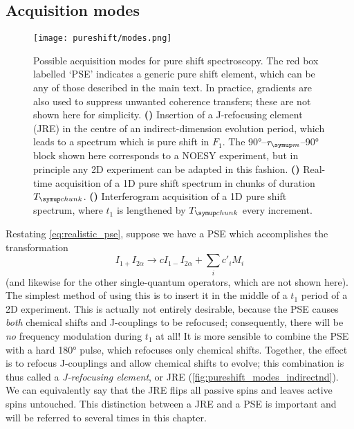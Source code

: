 \subsection{Acquisition modes}
\label{subsec:pureshift__acquisition_modes}

\begin{figure}[htbp]
    \centering
    \texttt{[image: pureshift/modes.png]}%
    {\label{fig:pureshift_modes_indirectnd}}%
    {\label{fig:pureshift_modes_realtime}}%
    {\label{fig:pureshift_modes_interferogram}}%
    \caption[Pure shift acquisition modes]{
        Possible acquisition modes for pure shift spectroscopy.
        The red box labelled `PSE' indicates a generic pure shift element, which can be any of those described in the main text.
        In practice, gradients are also used to suppress unwanted coherence transfers; these are not shown here for simplicity.
        \textbf{()} Insertion of a J-refocusing element (JRE) in the centre of an indirect-dimension evolution period, which leads to a spectrum which is pure shift in $F_1$.
        The \ang{90}--$\taum$--\ang{90} block shown here corresponds to a NOESY experiment, but in principle any 2D experiment can be adapted in this fashion.
        \textbf{()} Real-time acquisition of a 1D pure shift spectrum in chunks of duration $\Tchunk$.
        \textbf{()} Interferogram acquisition of a 1D pure shift spectrum, where $t_1$ is lengthened by $\Tchunk$ every increment.
    }
    \label{fig:pureshift_modes}
\end{figure}

Restating \cref{eq:realistic_pse}, suppose we have a PSE which accomplishes the transformation
\begin{equation}
    \label{eq:pse_revisited}
    I_{1+}I_{2\alpha} \longrightarrow c I_{1-}I_{2\alpha} + \sum_i c'_i M_i
\end{equation}
(and likewise for the other single-quantum operators, which are not shown here).
The simplest method of using this is to insert it in the middle of a $t_1$ period of a 2D experiment.
This is actually not entirely desirable, because the PSE causes \textit{both} chemical shifts and J-couplings to be refocused; consequently, there will be \textit{no} frequency modulation during $t_1$ at all!
It is more sensible to combine the PSE with a hard \ang{180} pulse, which refocuses only chemical shifts.
Together, the effect is to refocus J-couplings and allow chemical shifts to evolve; this combination is thus called a \textit{J-refocusing element}, or JRE (\cref{fig:pureshift_modes_indirectnd}).
We can equivalently say that the JRE flips all passive spins and leaves active spins untouched.
This distinction between a JRE and a PSE is important and will be referred to several times in this chapter.

